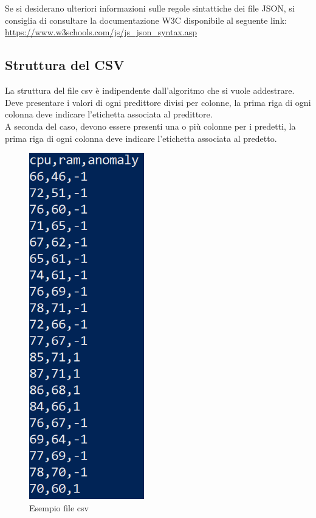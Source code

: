 		\mbox{} \\ \\ 
		Se si desiderano ulteriori informazioni sulle regole sintattiche dei file JSON, si consiglia di consultare la documentazione W3C disponibile al seguente link:
		\\[0.2cm]
		\hspace*{10mm}
		\url{https://www.w3schools.com/js/js_json_syntax.asp}
		
	\subsection{Struttura del CSV}
	La struttura del file csv è indipendente dall'algoritmo che si vuole addestrare.
	Deve presentare i valori di ogni predittore divisi per colonne, la prima riga di ogni colonna deve indicare l'etichetta associata al predittore. \\
	A seconda del caso, devono essere presenti una o più colonne per i predetti, la prima riga di ogni colonna deve indicare l'etichetta associata al predetto.
	\mbox{}
	\begin{figure} [H]
		\begin{center}
			\includegraphics[width=50mm]{./img/csv1.png}
		\end{center}
		\caption{Esempio file csv}
	\end{figure}
